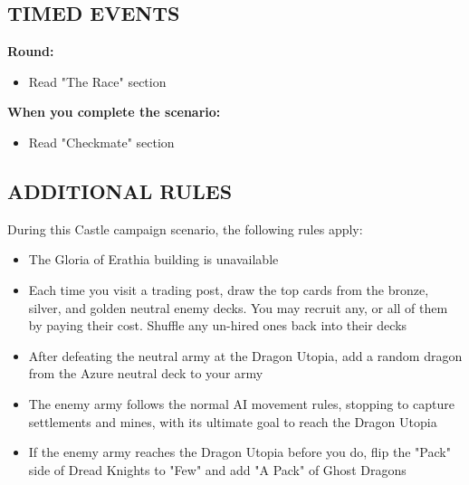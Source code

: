\newpage

\begin{multicols}{2}

\subsection*{\MakeUppercase{Timed Events}}

\textbf{ Round:}
\begin{itemize}
  \item Read "The Race" section
\end{itemize}

\textbf{When you complete the scenario:}
\begin{itemize}
  \item Read "Checkmate" section
\end{itemize}

\subsection*{\MakeUppercase{Additional rules}}

During this Castle campaign scenario, the following rules apply:

\begin{itemize}
  \item The Gloria of Erathia building is unavailable
  \item Each time you visit a trading post, draw the top cards from the  bronze,  silver, and  golden neutral enemy decks. You may recruit any, or all of them by paying their cost. Shuffle any un-hired ones back into their decks
  \item After defeating the neutral army at the Dragon Utopia, add a random dragon from the  Azure neutral deck to your army
  \item The enemy army follows the normal AI movement rules, stopping to capture settlements and mines, with its ultimate goal to reach the Dragon Utopia
  \item If the enemy army reaches the Dragon Utopia before you do, flip the "Pack" side of Dread Knights to "Few" and add "A Pack" of Ghost Dragons
\end{itemize}



\end{multicols}

